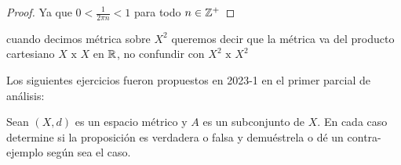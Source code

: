 \begin{itemize}[leftmargin=*]
\begin{proof}
Ya que $0<\frac{1}{2\pi n}< 1$ para todo $n \in \mathbb{Z}^+$

    
\end{proof}  
   
   \begin{note}
   cuando decimos métrica sobre $X^2$ queremos decir que la métrica va del producto cartesiano $X \text{ x } X$ en $\mathbb{R}$, no confundir con $X^2 \text{ x } X^2$ 
   \end{note}
   


\begin{note}
Los siguientes ejercicios fueron propuestos en 2023-1 en el primer parcial de análisis:
\end{note}

\end{itemize}


Sean $(X, d)$ es un espacio métrico y $A$ es un subconjunto de $X$. En cada caso determine si la proposición es verdadera o falsa y demuéstrela o dé un contra-ejemplo según sea el caso.

